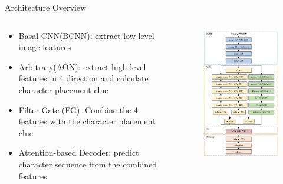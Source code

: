 \documentclass[compress]{beamer}
\begin{document}
\begin{frame}{Architecture Overview}
    \begin{columns}
        \begin{column}[T]{.5\textwidth}
            \begin{itemize}
                \item <1-> Basal CNN(BCNN): extract low level image features
                \item <2-> Arbitrary(AON): extract high level features in 4 direction and calculate character placement clue
                \item <3-> Filter Gate (FG): Combine the 4 features with the character placement clue
                \item <4-> Attention-based Decoder: predict character sequence from the combined features
            \end{itemize}
        \end{column}
        \begin{column}[T]{.5\textwidth}
            \begin{figure}
                \includegraphics[width=\textwidth,height=.8\textheight]{arch}

\end{figure}
\end{column}
\end{columns}
\end{frame}
\end{document}
